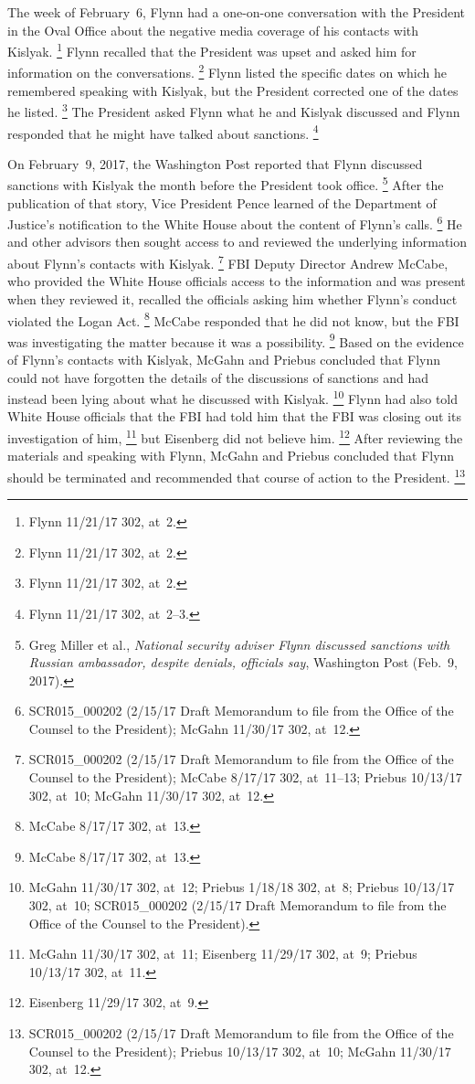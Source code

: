 The week of February~6, Flynn had a one-on-one conversation with the President in the Oval Office about the negative media coverage of his contacts with Kislyak.%
\footnote{Flynn 11/21/17 302, at~2.}
Flynn recalled that the President was upset and asked him for information on the conversations.%
\footnote{Flynn 11/21/17 302, at~2.}
Flynn listed the specific dates on which he remembered speaking with Kislyak, but the President corrected one of the dates he listed.%
\footnote{Flynn 11/21/17 302, at~2.}
The President asked Flynn what he and Kislyak discussed and Flynn responded that he might have talked about sanctions.%
\footnote{Flynn 11/21/17 302, at~2--3.}

On February~9, 2017, the Washington Post reported that Flynn discussed sanctions with Kislyak the month before the President took office.%
\footnote{Greg Miller et al., \textit{National security adviser Flynn discussed sanctions with Russian ambassador, despite denials, officials say}, Washington Post (Feb.~9, 2017).}
After the publication of that story, Vice President Pence learned of the Department of Justice's notification to the White House about the content of Flynn's calls.%
\footnote{SCR015\_000202 (2/15/17 Draft Memorandum to file from the Office of the Counsel to the President); McGahn 11/30/17 302, at~12.}
He and other advisors then sought access to and reviewed the underlying information about Flynn's contacts with Kislyak.%
\footnote{SCR015\_000202 (2/15/17 Draft Memorandum to file from the Office of the Counsel to the President);
McCabe 8/17/17 302, at~11--13;
Priebus 10/13/17 302, at~10;
McGahn 11/30/17 302, at~12.}
FBI Deputy Director Andrew McCabe, who provided the White House officials access to the information and was present when they reviewed it, recalled the officials asking him whether Flynn's conduct violated the Logan Act.%
\footnote{McCabe 8/17/17 302, at~13.}
McCabe responded that he did not know, but the FBI was investigating the matter because it was a possibility.%
\footnote{McCabe 8/17/17 302, at~13.}
Based on the evidence of Flynn's contacts with Kislyak, McGahn and Priebus concluded that Flynn could not have forgotten the details of the discussions of sanctions and had instead been lying about what he discussed with Kislyak.%
\footnote{McGahn 11/30/17 302, at~12;
Priebus 1/18/18 302, at~8;
Priebus 10/13/17 302, at~10;
SCR015\_000202 (2/15/17 Draft Memorandum to file from the Office of the Counsel to the President).}
Flynn had also told White House officials that the FBI had told him that the FBI was closing out its investigation of him,%
\footnote{McGahn 11/30/17 302, at~11;
Eisenberg 11/29/17 302, at~9;
Priebus 10/13/17 302, at~11.}
but Eisenberg did not believe him.%
\footnote{Eisenberg 11/29/17 302, at~9.}
After reviewing the materials and speaking with Flynn, McGahn and Priebus concluded that Flynn should be terminated and recommended that course of action to the President.%
\footnote{SCR015\_000202 (2/15/17 Draft Memorandum to file from the Office of the Counsel to the President);
Priebus 10/13/17 302, at~10;
McGahn 11/30/17 302, at~12.}

